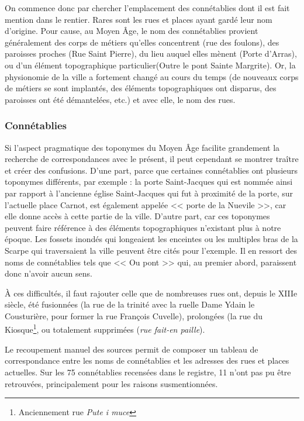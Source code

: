 On commence donc par chercher l'emplacement des connétablies dont il est fait mention dans le rentier. Rares sont les rues et places ayant gardé leur nom d'origine. Pour cause, au Moyen Âge, le nom des connétablies provient généralement des corps de métiers qu'elles concentrent (rue des foulons), des paroisses proches (Rue Saint Pierre),  du lieu auquel elles mènent (Porte d'Arras), ou d'un élément topographique particulier(Outre le pont Sainte Margrite). Or, la physionomie de la ville  a fortement changé  au cours du temps (de nouveaux corps de métiers se sont implantés, des éléments topographiques ont disparus, des paroisses ont été démantelées, etc.) et avec elle, le nom des rues.

\subsubsection{Connétablies}
Si l'aspect pragmatique des toponymes du Moyen Âge facilite grandement la recherche de correspondances avec le présent, il peut cependant se montrer traître  et créer des confusions. D'une part, parce que certaines connétablies ont plusieurs toponymes différents, par exemple : la porte Saint-Jacques qui est nommée ainsi par rapport à l'ancienne église Saint-Jacques qui fut à proximité de la porte, sur l'actuelle place Carnot, est également appelée << porte de la Nuevile >>, car elle donne accès à cette partie de la ville. D'autre part, car ces toponymes peuvent faire référence à des éléments topographiques n'existant plus à notre époque. Les fossets inondés qui longeaient les enceintes ou les multiples bras de la Scarpe qui traversaient la ville peuvent être cités pour l'exemple. Il en ressort des noms de connétablies tels que << Ou pont >> qui, au premier abord, paraissent donc n'avoir aucun sens.

À ces difficultés, il faut rajouter celle que de nombreuses rues ont, depuis le XIIIe siècle, été fusionnées (la rue de la trinité  avec la ruelle Dame Ydain le Cousturière,  pour former la rue François Cuvelle), prolongées (la rue du Kiosque\footnote{Anciennement  rue \textit{Pute i muce}}, ou totalement supprimées (\textit{rue fait-en paille}).

Le recoupement manuel des sources permit de composer un tableau de correspondance entre les noms de connétablies et les adresses des rues et places actuelles.
Sur les 75 connétablies recensées dans le registre, 11 n'ont pas pu être retrouvées, principalement pour les raisons susmentionnées. 

